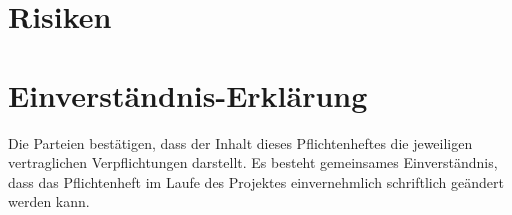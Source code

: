 \documentclass[
11pt,
a4paper,
ngerman,
]{article}
\begin{document}


\tableofcontents
\listoffigures
\listoftables

\newpage






\newpage



\newpage



\newpage





\newpage

\section{Risiken}

\newpage

\section{Einverständnis-Erklärung}

Die Parteien bestätigen, dass der Inhalt dieses Pflichtenheftes die jeweiligen vertraglichen Verpflichtungen darstellt. Es besteht gemeinsames Einverständnis, dass das Pflichtenheft im Laufe des Projektes einvernehmlich schriftlich geändert werden kann.
\end{document}
